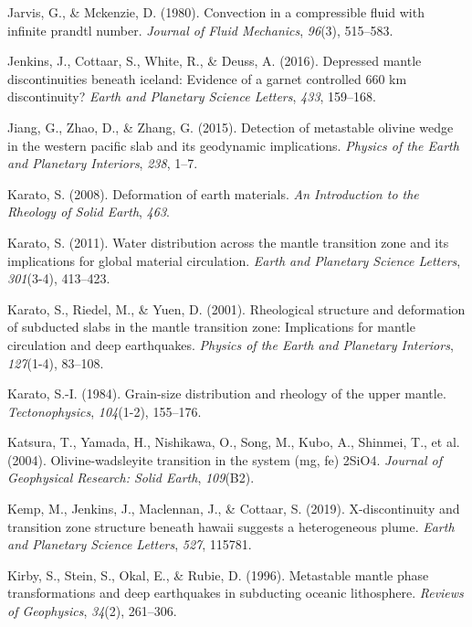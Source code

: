 \documentclass[
  paper=a4,
  ,captions=tableheading
]{scrartcl}
\newlength{\cslhangindent}
\newenvironment{CSLReferences}[2] %
  {\begin{list}{}{%
   \setlength{\itemindent}{0pt}
   \setlength{\leftmargin}{0pt}
   \setlength{\parsep}{0pt}
   \ifodd #1
    \setlength{\leftmargin}{\cslhangindent}
    \setlength{\itemindent}{-1\cslhangindent}
   \fi
   \setlength{\itemsep}{#2\baselineskip}}}
  {\end{list}}
\begin{document}
\begin{CSLReferences}{1}{0}
Jarvis, G., \& Mckenzie, D. (1980). Convection in a compressible fluid
with infinite prandtl number. \emph{Journal of Fluid Mechanics},
\emph{96}(3), 515--583.

Jenkins, J., Cottaar, S., White, R., \& Deuss, A. (2016). Depressed
mantle discontinuities beneath iceland: Evidence of a garnet controlled
660 km discontinuity? \emph{Earth and Planetary Science Letters},
\emph{433}, 159--168.

Jiang, G., Zhao, D., \& Zhang, G. (2015). Detection of metastable
olivine wedge in the western pacific slab and its geodynamic
implications. \emph{Physics of the Earth and Planetary Interiors},
\emph{238}, 1--7.

Karato, S. (2008). Deformation of earth materials. \emph{An Introduction
to the Rheology of Solid Earth}, \emph{463}.

Karato, S. (2011). Water distribution across the mantle transition zone
and its implications for global material circulation. \emph{Earth and
Planetary Science Letters}, \emph{301}(3-4), 413--423.

Karato, S., Riedel, M., \& Yuen, D. (2001). Rheological structure and
deformation of subducted slabs in the mantle transition zone:
Implications for mantle circulation and deep earthquakes. \emph{Physics
of the Earth and Planetary Interiors}, \emph{127}(1-4), 83--108.

Karato, S.-I. (1984). Grain-size distribution and rheology of the upper
mantle. \emph{Tectonophysics}, \emph{104}(1-2), 155--176.

{Katsura, T., Yamada, H., Nishikawa, O., Song, M., Kubo, A., Shinmei,
T., et al.} (2004). Olivine-wadsleyite transition in the system (mg, fe)
2SiO4. \emph{Journal of Geophysical Research: Solid Earth},
\emph{109}(B2).

Kemp, M., Jenkins, J., Maclennan, J., \& Cottaar, S. (2019).
X-discontinuity and transition zone structure beneath hawaii suggests a
heterogeneous plume. \emph{Earth and Planetary Science Letters},
\emph{527}, 115781.

Kirby, S., Stein, S., Okal, E., \& Rubie, D. (1996). Metastable mantle
phase transformations and deep earthquakes in subducting oceanic
lithosphere. \emph{Reviews of Geophysics}, \emph{34}(2), 261--306.


\end{CSLReferences}
\end{document}
